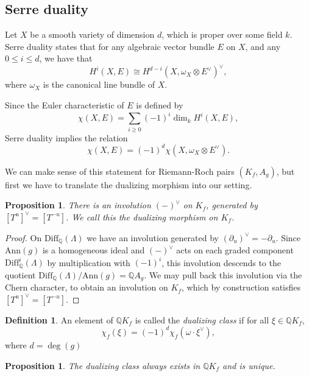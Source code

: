 \documentclass[oneside]{amsart}
\theoremstyle{plain}
\newtheorem{proposition}[theorem]{Proposition}
\theoremstyle{definition}
\newtheorem{definition}[theorem]{Definition}
\newcommand{\Q}{{\mathbb{Q}}}
\newcommand{\Ann}{{\mathrm{Ann}}}
\newcommand{\Diff}{{\mathrm{Diff}}}
\begin{document}
\subsection{Serre duality}\label{subsec:serre-duality}

Let $X$ be a smooth variety of dimension $d$, which is proper over some field $k$. Serre duality states that for any algebraic vector bundle $E$ on $X$, and any $0 \leq i \leq d$, we have that
\[
    H^i(X, E) \cong H^{d-i}(X, \omega_X \otimes E^\vee)^\vee,
\]
where $\omega_X$ is the canonical line bundle of $X$.

Since the Euler characteristic of $E$ is defined by
\[
\chi(X, E) = \sum_{i \geq 0} (-1)^i \dim_k H^i(X, E),
\]
Serre duality implies the relation
\[
\chi(X, E) = (-1)^d \chi(X, \omega_X \otimes E^\vee).
\]

We can make sense of this statement for Riemann-Roch pairs $(K_f, A_g)$, but first we have to translate the dualizing morphism into our setting.

\begin{proposition} \label{prop:dualizing-morphism}
    There is an involution $(-)^\vee$ on $K_f$, generated by
    $[T^u]^\vee = [T^{-u}]$. We call this the \emph{dualizing morphism} on $K_f$.
\end{proposition}

\begin{proof}
    On $\Diff_\Q(\Lambda)$ we have an involution generated by $(\partial_u)^\vee = -\partial_{u}$.
    Since $\Ann(g)$ is a homogeneous ideal and $(-)^\vee$ acts on each graded component $\Diff_\Q^i(\Lambda)$ by multiplication with $(-1)^{i}$, this involution descends to the quotient
    $\Diff_\Q(\Lambda)/\Ann(g) = \Q A_g$.
    We may pull back this involution via the Chern character, to obtain
    an involution on $K_f$, which by construction satisfies
    $[T^u]^\vee = [T^{-u}]$.
\end{proof}

\begin{definition}
    \label{def:dualizing-class}
    An element of $\Q K_f$ is called the \emph{dualizing class} if for all $\xi \in \Q K_f$,
    \[\chi_f(\xi) = (-1)^d\chi_f(\omega \cdot \xi^\vee),\]
    where $d=\deg(g)$
\end{definition}


\begin{proposition}\label{prop:serre duality}
    The dualizing class always exists in $\Q K_f$
    and is unique.
\end{proposition}
\end{document}
